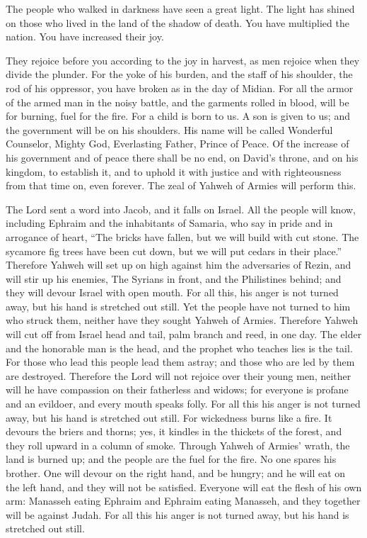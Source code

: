  The people who walked in darkness have seen a great
light. The light has shined on those who lived in the land of the shadow
of death.  You have multiplied the nation. You have
increased their joy.

They rejoice before you according to the joy in harvest, as men rejoice
when they divide the plunder.  For the yoke of his burden,
and the staff of his shoulder, the rod of his oppressor, you have broken
as in the day of Midian.  For all the armor of the armed
man in the noisy battle, and the garments rolled in blood, will be for
burning, fuel for the fire.  For a child is born to us. A
son is given to us; and the government will be on his shoulders. His
name will be called Wonderful Counselor, Mighty God, Everlasting Father,
Prince of Peace.  Of the increase of his government and of
peace there shall be no end, on David's throne, and on his kingdom, to
establish it, and to uphold it with justice and with righteousness from
that time on, even forever. The zeal of Yahweh of Armies will perform
this.

 The Lord sent a word into Jacob, and it falls on Israel.
 All the people will know, including Ephraim and the
inhabitants of Samaria, who say in pride and in arrogance of heart,
 ``The bricks have fallen, but we will build with cut
stone. The sycamore fig trees have been cut down, but we will put cedars
in their place.''  Therefore Yahweh will set up on high
against him the adversaries of Rezin, and will stir up his enemies,
 The Syrians in front, and the Philistines behind; and
they will devour Israel with open mouth. For all this, his anger is not
turned away, but his hand is stretched out still.  Yet
the people have not turned to him who struck them, neither have they
sought Yahweh of Armies.  Therefore Yahweh will cut off
from Israel head and tail, palm branch and reed, in one day.
 The elder and the honorable man is the head, and the
prophet who teaches lies is the tail.  For those who lead
this people lead them astray; and those who are led by them are
destroyed.  Therefore the Lord will not rejoice over
their young men, neither will he have compassion on their fatherless and
widows; for everyone is profane and an evildoer, and every mouth speaks
folly. For all this his anger is not turned away, but his hand is
stretched out still.  For wickedness burns like a fire.
It devours the briers and thorns; yes, it kindles in the thickets of the
forest, and they roll upward in a column of smoke. 
Through Yahweh of Armies' wrath, the land is burned up; and the people
are the fuel for the fire. No one spares his brother. 
One will devour on the right hand, and be hungry; and he will eat on the
left hand, and they will not be satisfied. Everyone will eat the flesh
of his own arm:  Manasseh eating Ephraim and Ephraim
eating Manasseh, and they together will be against Judah. For all this
his anger is not turned away, but his hand is stretched out still.

